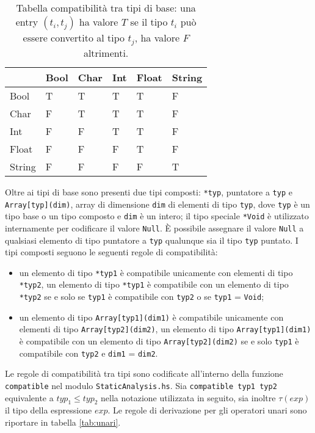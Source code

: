 \begin{table}[]
\begin{tabular}{l|lllll}
    & Bool & Char & Int & Float & String \\ \hline
Bool   & T    & T    & T   & T     & F      \\
Char   & F    & T    & T   & T     & F      \\
Int    & F    & F    & T   & T     & F      \\
Float  & F    & F    & F   & T     & F      \\
String & F    & F    & F   & F     & T     
\end{tabular}
\caption{Tabella compatibilità tra tipi di base: una entry $(t_i, t_j)$ ha valore $T$ se il tipo $t_i$ può essere convertito al tipo $t_j$, ha valore $F$ altrimenti.}
\label{tab:compatibilitaTipiBase}
\end{table}

Oltre ai tipi di base  sono presenti due tipi composti: \texttt{*typ}, puntatore a \texttt{typ} e \texttt{Array[typ](dim)}, array di dimensione \texttt{dim} di elementi di tipo \texttt{typ}, dove \texttt{typ} è un tipo base o un tipo composto e \texttt{dim} è un intero; il tipo speciale \texttt{*Void} è utilizzato internamente per codificare il valore \texttt{Null}. È possibile assegnare il valore \texttt{Null} a qualsiasi elemento di tipo puntatore a \texttt{typ} qualunque sia il tipo \texttt{typ} puntato.
I tipi composti seguono le seguenti regole di compatibilità:
\begin{itemize}
\item un elemento di tipo \texttt{*typ1} è compatibile unicamente con elementi di tipo \texttt{*typ2}, un elemento di tipo \texttt{*typ1} è compatibile con un elemento di tipo \texttt{*typ2} se e solo se \texttt{typ1} è compatibile con \texttt{typ2} o se \texttt{typ1} = \texttt{Void};
\item un elemento di tipo \texttt{Array[typ1](dim1)} è compatibile unicamente con elementi di tipo \texttt{Array[typ2](dim2)}, un elemento di tipo \texttt{Array[typ1](dim1)} è compatibile con un elemento di tipo \texttt{Array[typ2](dim2)} se e solo \texttt{typ1} è compatibile con \texttt{typ2} e \texttt{dim1} = \texttt{dim2}.
\end{itemize}

Le regole di compatibilità tra tipi sono codificate all'interno della funzione \texttt{compatible} nel modulo \texttt{StaticAnalysis.hs}.
Sia \texttt{compatible typ1 typ2} equivalente a $typ_1 \leq typ_2$ nella notazione utilizzata in seguito, sia inoltre $\tau(exp)$ il tipo della espressione $exp$.
Le regole di derivazione per gli operatori unari sono riportare in tabella \ref{tab:unari}.

